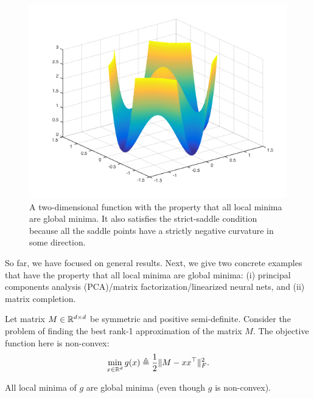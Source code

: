 \begin{figure}[ht!]
    \centering
    \includegraphics[scale = 0.5]{figures/localmin.png}
    \caption{A two-dimensional function with the property that all local minima are global minima. It also satisfies the strict-saddle condition because all the saddle points have a strictly negative curvature in some direction.}
    \label{lec10:fig:strict-saddle}
\end{figure}

 \label{sec:two_optim_examples}
So far, we have focused on general results. Next, we give two concrete examples that have the property that all local minima are global minima: (i) principal components analysis (PCA)/matrix factorization/linearized neural nets, and (ii) matrix completion. %

Let matrix $M \in \mathbb R^{d \times d}$ be symmetric and positive semi-definite. Consider the problem of finding the best rank-1 approximation of the matrix $M$. The objective function here is non-convex:
\begin{equation}
    \min_{x \in \mathbb R^d}g(x) \triangleq \frac{1}{2}\|M - xx^\top \|_F^2.
\end{equation}

\begin{theorem}
All local minima of $g$ are global minima (even though $g$ is non-convex).
\end{theorem}


